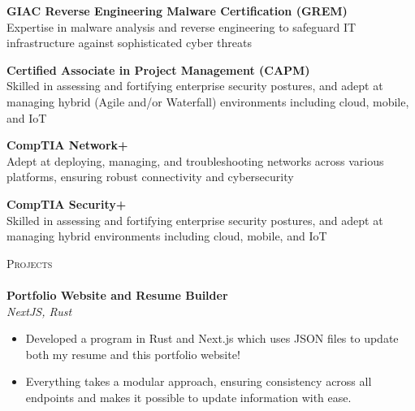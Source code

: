 \documentclass[a4paper]{article}
\newcommand{\lineunder} {
        \vspace*{-8pt} \\
        \hspace*{-18pt} \hrulefill \\
    }
\newcommand{\header} [1] {
        {\hspace*{-18pt}\vspace*{6pt} \textsc{#1}}
        \vspace*{-6pt} \lineunder
    }
\begin{document}
            {\textbf{GIAC Reverse Engineering Malware Certification (GREM)}}\\
            Expertise in malware analysis and reverse engineering to safeguard IT infrastructure against sophisticated cyber threats\\
            \vspace*{2mm}
            
            {\textbf{Certified Associate in Project Management (CAPM)}}\\
            Skilled in assessing and fortifying enterprise security postures, and adept at managing hybrid (Agile and/or Waterfall) environments including cloud, mobile, and IoT\\
            \vspace*{2mm}
            
            {\textbf{CompTIA Network+}}\\
            Adept at deploying, managing, and troubleshooting networks across various platforms, ensuring robust connectivity and cybersecurity\\
            \vspace*{2mm}
            
            {\textbf{CompTIA Security+}}\\
            Skilled in assessing and fortifying enterprise security postures, and adept at managing hybrid environments including cloud, mobile, and IoT\\
            \vspace*{2mm}
            
    \header{Projects}
    
            {\textbf{Portfolio Website and Resume Builder}}\\
            \textit{NextJS, Rust}
            \vspace{-1mm}
            \begin{itemize} \itemsep 1pt
            
                    \item Developed a program in Rust and Next.js which uses JSON files to update both my resume and this portfolio website!
                
                    \item Everything takes a modular approach, ensuring consistency across all endpoints and makes it possible to update information with ease.
                
            \end{itemize}
            \vspace*{2mm}
            
\end{document}
